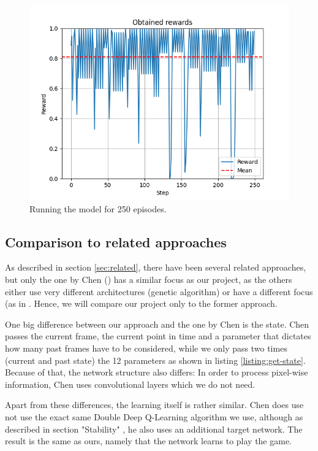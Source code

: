 \begin{figure}[h]
    \centering
    \includegraphics[width=\textwidth]{media/performancePlot.png}
    \caption{Running the model for 250 episodes.}
    \label{fig:performance-plot}
\end{figure}

\subsection{Comparison to related approaches}
As described in section \ref{sec:related}, there have been several related approaches, but only the one by Chen (\cite{chendeep}) has a similar focus as our project, as the others either use very different architectures (genetic algorithm) or have a different focus (as in \cite{performanceFB}. Hence, we will compare our project only to the former approach.
\par
One big difference between our approach and the one by Chen is the state. Chen passes the current frame, the current point in time and a parameter that dictates how many past frames have to be considered, while we only pass two times (current and past state) the 12 parameters as shown in listing \ref{listing:get-state}. Because of that, the network structure also differs: In order to process pixel-wise information, Chen uses convolutional layers which we do not need.
\par
Apart from these differences, the learning itself is rather similar. Chen does use not use the exact same Double Deep Q-Learning algorithm we use, although as described in section "Stability" \cite[p. 3]{chendeep}, he also uses an additional target network. The result is the same as ours, namely that the network learns to play the game.